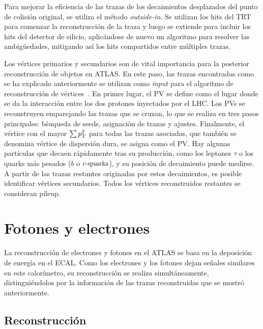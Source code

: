 Para mejorar la eficiencia de las trazas de los decaimientos desplazados del punto de colisión original, se utiliza el m\'etodo \textit{outside-in}. Se utilizan los hits del \ac{TRT} para comenzar la reconstrucci\'on de la traza y luego se extiende para incluir los hits del detector de silicio, aplicándose de nuevo un algoritmo para resolver las ambigüedades, mitigando as\'i los hits compartidos entre m\'ultiples trazas.

Los vértices primarios y secundarios son de vital importancia para la posterior reconstrucción de objetos en \ac{ATLAS}. En este paso, las trazas encontradas como se ha explicado anteriormente se utilizan como \textit{input} para el algoritmo de reconstrucci\'on de vértices~\cite{ATLAS-PVReconstruction,ATLAS-VertexReconstruction}. En primer lugar, el \ac{PV} se define como el lugar donde se da la interacci\'on entre los dos protones inyectados por el \ac{LHC}. Los \acp{PV} se reconstruyen emparejando las trazas que se cruzan, lo que se realiza en tres pasos principales: b\'suqueda de seeds, asignación de trazas y ajustes. Finalmente, el vértice con el mayor \(\sum p_{\text{T}}^2\) para todas las trazas asociadas, que tambi\'en se denomina vértice de dispersión dura, se asigna como el \ac{PV}.
Hay algunas partículas que decaen rápidamente tras su producción, como los leptones \(\tau\) o los quarks más pesados (\(b\) o \(c\text{-quarks}\)), y su posición de decaimiento puede medirse. A partir de las trazas restantes originadas por estos decaimientos, es posible identificar vértices secundarios. Todos los vértices reconstruidos restantes se consideran pileup.








\section{Fotones y electrones}

La reconstrucción de electrones y fotones en el \ac{ATLAS} se basa en la deposición de energía en el \ac{ECAL}. Como los electrones y los fotones dejan señales similares en este calor\'imetro, su reconstrucción se realiza simultáneamente, distinguiéndolos por la información de las trazas reconstruidas que se mostr\'o anteriormente.


\subsection{Reconstrucci\'on}
\label{subsec:objects:egamma:reco}

